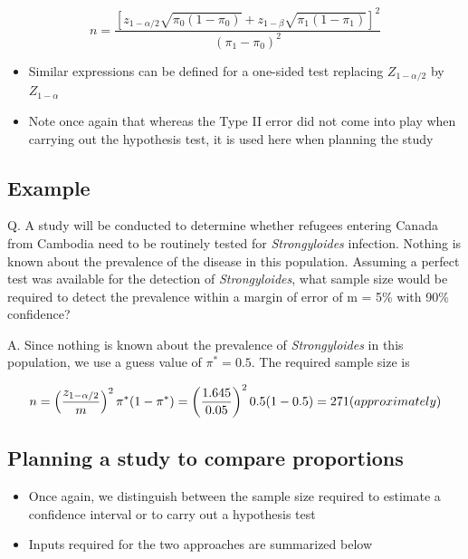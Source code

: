 \documentclass[
]{book}
\providecommand{\tightlist}{%
  \setlength{\itemsep}{0pt}\setlength{\parskip}{0pt}}
\begin{document}
\[n=\frac{[z_{1-\alpha/2}\sqrt{\pi_0(1-\pi_0)}+z_{1-\beta}\sqrt{\pi_1(1-\pi_1)}]^2}{(\pi_1-\pi_0)^2}\]

\begin{itemize}
\tightlist
\item
  Similar expressions can be defined for a one-sided test replacing \(Z_{1-α/2}\) by \(Z_{1-α}\)
\item
  Note once again that whereas the Type II error did not come into play when carrying out the hypothesis test, it is used here when planning the study
\end{itemize}

\hypertarget{example-5}{%
\subsection{Example}\label{example-5}}

Q. A study will be conducted to determine whether refugees entering Canada from Cambodia need to be routinely tested for \emph{Strongyloides} infection. Nothing is known about the prevalence of the disease in this population. Assuming a perfect test was available for the detection of \emph{Strongyloides}, what sample size would be required to detect the prevalence within a margin of error of m = 5\% with 90\% confidence?

A. Since nothing is known about the prevalence of \emph{Strongyloides} in this population, we use a guess value of \(\pi^*=0.5\). The required sample size is

\[n=\left(\frac{z_{1-\alpha/2}}{m}\right)^2\pi^*(1-\pi^*)=\left(\frac{1.645}{0.05}\right)^20.5(1-0.5)=271\space (approximately)\]

\hypertarget{planning-a-study-to-compare-proportions}{%
\subsection{Planning a study to compare proportions}\label{planning-a-study-to-compare-proportions}}

\begin{itemize}
\tightlist
\item
  Once again, we distinguish between the sample size required to estimate a confidence interval or to carry out a hypothesis test
\item
  Inputs required for the two approaches are summarized below
\end{itemize}
\end{document}
